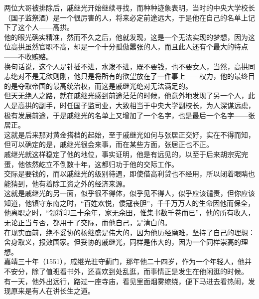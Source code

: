 \begin{multicols}{\theparacolNo}
两位大哥被排除后，戚继光开始继续寻找，而种种迹象表明，当时的中央大学校长（国子监祭酒）是一个很厉害的人，将来必定前途远大，于是他在自己的名单上记下了这个人——高拱。\\

他的眼光确实精准，然而不久之后，他就发现，这是一个无法实现的梦想，因为这位高拱虽然官职不高，却是一个十分孤傲嚣张的人，而且此人还有个最大的特点——不收贿赂。\\

换句话说，这个人是针插不进，水泼不进，既不要钱，也不要女人，当然，高拱同志绝对不是无欲则刚，他只是将所有的欲望放在了一件事上——权力，他的最终目的是夺取帝国的最高统治权，而这是戚继光绝对无法满足的。\\

但天无绝人之路，就在戚继光感到前途茫茫的时候，他意外地发现了另一个人，此人是高拱的副手，时任国子监司业，大致相当于中央大学副校长，为人深谋远虑，极有发展前途，于是戚继光的名单上又增加了一个名字，也是最后一个名字——张居正。\\

这就是后来那对黄金搭档的起始，至于戚继光如何与张居正交好，实在不得而知，但可以确定的是，戚继光很会来事，而在某些方面，张居正也不正。\\

戚继光就这样稳定了他的地位，事实证明，他是有远见的，以至于后来胡宗宪完蛋，他依然屹立不倒数十年，这都归功于他的交际工作。\\

交际是要钱的，而以戚继光的级别待遇，即使借高利贷也不经用，所以闭着眼睛也能猜到，他有着除工资之外的经济来源。\\

这就是戚继光的另一面，似乎很不得体，似乎见不得人，似乎应该谴责，但你应该知道，他镇守东南之时，“百姓欢悦，倭寇丧胆”，千千万万人的生命因他而保全，他离职之时，“领将印三十余年，家无余田，惟集书数千卷而已”，他的所有收入，无论正当与否，都用于了交际，而他自己，是清白的。\\

在现实面前，绝不妥协的杨继盛是伟大的，因为他历经磨难，坚持了自己的理想：舍身取义，报效国家。但妥协的戚继光，同样是伟大的，因为一个同样崇高的理想。\\

嘉靖三十年（1551），戚继光驻守蓟门，那年他二十四岁，作为一个年轻人，他并不安分，除了值班看书外，还喜欢到处乱逛，而事情正是发生在他闲逛的时候。\\

有一天，他外出远行，路过一座寺庙，看见里面烟雾缭绕，便下马进去看热闹，发现原来是有人在讲长生之道。\\


\end{multicols}
